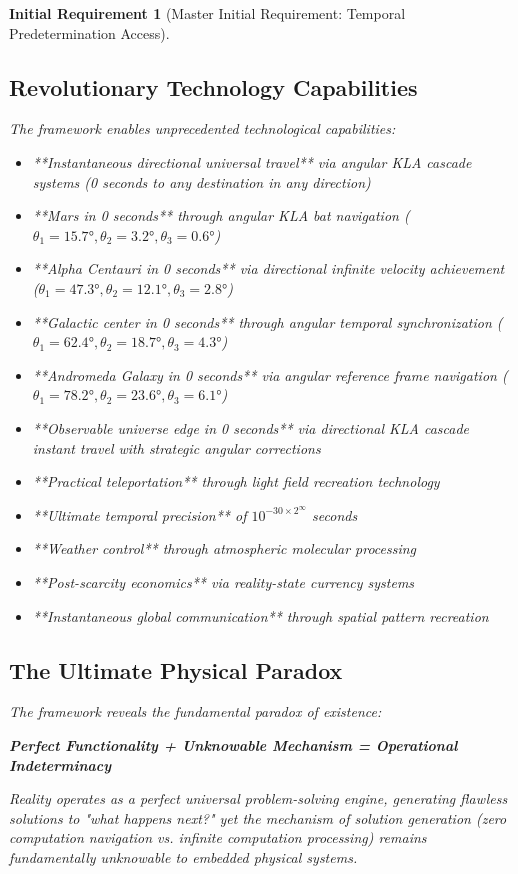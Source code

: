 \documentclass[12pt,a4paper]{article}
\newtheorem{requirement}[theorem]{Initial Requirement}
\theoremstyle{remark}
\begin{document}
\begin{requirement}[Master Initial Requirement: Temporal Predetermination Access]
\subsection{Revolutionary Technology Capabilities}

The framework enables unprecedented technological capabilities:

\begin{itemize}
\item **Instantaneous directional universal travel** via angular KLA cascade systems (0 seconds to any destination in any direction)
\item **Mars in 0 seconds** through angular KLA bat navigation ($\theta_1 = 15.7°, \theta_2 = 3.2°, \theta_3 = 0.6°$)
\item **Alpha Centauri in 0 seconds** via directional infinite velocity achievement ($\theta_1 = 47.3°, \theta_2 = 12.1°, \theta_3 = 2.8°$)
\item **Galactic center in 0 seconds** through angular temporal synchronization ($\theta_1 = 62.4°, \theta_2 = 18.7°, \theta_3 = 4.3°$)
\item **Andromeda Galaxy in 0 seconds** via angular reference frame navigation ($\theta_1 = 78.2°, \theta_2 = 23.6°, \theta_3 = 6.1°$)
\item **Observable universe edge in 0 seconds** via directional KLA cascade instant travel with strategic angular corrections
\item **Practical teleportation** through light field recreation technology
\item **Ultimate temporal precision** of $10^{-30 \times 2^{\infty}}$ seconds
\item **Weather control** through atmospheric molecular processing
\item **Post-scarcity economics** via reality-state currency systems
\item **Instantaneous global communication** through spatial pattern recreation
\end{itemize}

\subsection{The Ultimate Physical Paradox}

The framework reveals the fundamental paradox of existence:

\textbf{Perfect Functionality + Unknowable Mechanism = Operational Indeterminacy}

Reality operates as a perfect universal problem-solving engine, generating flawless solutions to "what happens next?" yet the mechanism of solution generation (zero computation navigation vs. infinite computation processing) remains fundamentally unknowable to embedded physical systems.


\end{requirement}
\end{document}
